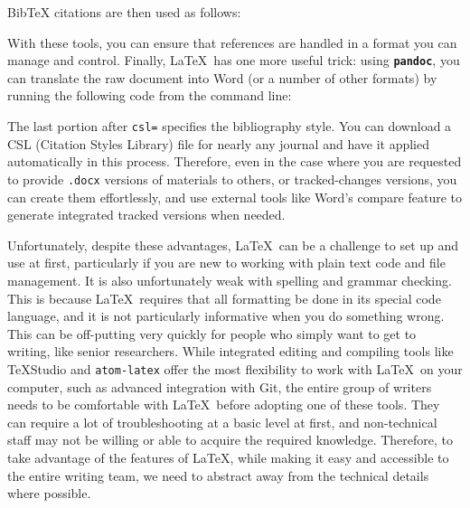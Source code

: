 
\noindent BibTeX citations are then used as follows:


With these tools, you can ensure that references are handled
in a format you can manage and control.\cite{flom2005latex}
Finally, \LaTeX\ has one more useful trick:
using \textbf{\texttt{pandoc}},
you can translate the raw document into Word
(or a number of other formats)
by running the following code from the command line:


\noindent The last portion after \texttt{csl=} specifies the bibliography style.
You can download a CSL (Citation Styles Library) file
for nearly any journal and have it applied automatically in this process.
Therefore, even in the case where you are requested to provide
\texttt{.docx} versions of materials to others, or tracked-changes versions,
you can create them effortlessly,
and use external tools like Word's compare feature
to generate integrated tracked versions when needed.

Unfortunately, despite these advantages, \LaTeX\ can be a challenge to set up and use at first,
particularly if you are new to working with plain text code and file management.
It is also unfortunately weak with spelling and grammar checking.
This is because \LaTeX\ requires that all formatting be done in its special code language,
and it is not particularly informative when you do something wrong.
This can be off-putting very quickly for people
who simply want to get to writing, like senior researchers.
While integrated editing and compiling tools like TeXStudio
and \texttt{atom-latex}
offer the most flexibility to work with \LaTeX\ on your computer,
such as advanced integration with Git,
the entire group of writers needs to be comfortable
with \LaTeX\ before adopting one of these tools.
They can require a lot of troubleshooting at a basic level at first,
and non-technical staff may not be willing or able to acquire the required knowledge.
Therefore, to take advantage of the features of \LaTeX,
while making it easy and accessible to the entire writing team,
we need to abstract away from the technical details where possible.

